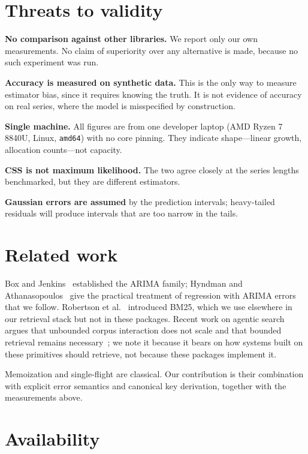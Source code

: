 \documentclass[10pt,twocolumn]{article}
\begin{document}
\section{Threats to validity}

\textbf{No comparison against other libraries.} We report only our own
measurements. No claim of superiority over any alternative is made, because no
such experiment was run.

\textbf{Accuracy is measured on synthetic data.} This is the only way to measure
estimator bias, since it requires knowing the truth. It is not evidence of
accuracy on real series, where the model is misspecified by construction.

\textbf{Single machine.} All figures are from one developer laptop
(AMD Ryzen 7 8840U, Linux, \texttt{amd64}) with no core pinning. They indicate
shape---linear growth, allocation counts---not capacity.

\textbf{CSS is not maximum likelihood.} The two agree closely at the series
lengths benchmarked, but they are different estimators.

\textbf{Gaussian errors are assumed} by the prediction intervals; heavy-tailed
residuals will produce intervals that are too narrow in the tails.

\section{Related work}

Box and Jenkins~\cite{boxjenkins} established the ARIMA family; Hyndman and
Athanasopoulos~\cite{hyndman} give the practical treatment of regression with
ARIMA errors that we follow. Robertson et al.~\cite{bm25} introduced BM25, which
we use elsewhere in our retrieval stack but not in these packages. Recent work on
agentic search argues that unbounded corpus interaction does not scale and that
bounded retrieval remains necessary~\cite{rise}; we note it because it bears on
how systems built on these primitives should retrieve, not because these packages
implement it.

Memoization and single-flight are classical. Our contribution is their
combination with explicit error semantics and canonical key derivation, together
with the measurements above.

\section{Availability}
\end{document}
